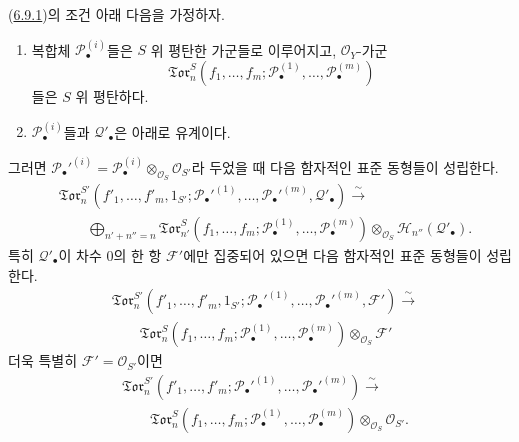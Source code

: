 \begin{corollary}[6.9.6]
\label{III.6.9.6-fr}
(\hyperref[subsection:III.6.9.fr]{6.9.1})의 조건 아래 다음을
가정하자.
\begin{enumerate}
  \item[$1^\circ$] 복합체 $\mathscr P_\bullet^{(i)}$들은 $S$ 위
  평탄한 가군들로 이루어지고, $\mathscr O_Y$-가군
  \[
    \mathfrak{Tor}_n^S
    (f_1,\ldots,f_m;
     \mathscr P_\bullet^{(1)},\ldots,\mathscr P_\bullet^{(m)})
  \]
  들은 $S$ 위 평탄하다.
  \item[$2^\circ$] $\mathscr P_\bullet^{(i)}$들과
  $\mathscr Q'_\bullet$은 아래로 유계이다.
\end{enumerate}

그러면
$\mathscr P_\bullet'^{(i)}
=\mathscr P_\bullet^{(i)}\otimes_{\mathscr O_S}\mathscr O_{S'}$라
두었을 때 다음 함자적인 표준 동형들이 성립한다.
\[
\begin{split}
  &\mathfrak{Tor}_n^{S'}
  (f'_1,\ldots,f'_m,1_{S'};
   \mathscr P_\bullet'^{(1)},\ldots,
   \mathscr P_\bullet'^{(m)},\mathscr Q'_\bullet)
  \xrightarrow{\sim}\\
  &\qquad
  \bigoplus_{n'+n''=n}
  \mathfrak{Tor}_{n'}^S
  (f_1,\ldots,f_m;
   \mathscr P_\bullet^{(1)},\ldots,
   \mathscr P_\bullet^{(m)})
  \otimes_{\mathscr O_S}\mathscr H_{n''}(\mathscr Q'_\bullet).
\end{split}
\tag{6.9.6.1}\label{III.6.9.6.1.fr}
\]
특히 $\mathscr Q'_\bullet$이 차수 $0$의 한 항
$\mathscr F'$에만 집중되어 있으면 다음 함자적인 표준 동형들이
성립한다.
\[
\begin{split}
  &\mathfrak{Tor}_n^{S'}
  (f'_1,\ldots,f'_m,1_{S'};
   \mathscr P_\bullet'^{(1)},\ldots,
   \mathscr P_\bullet'^{(m)},\mathscr F')
  \xrightarrow{\sim}\\
  &\qquad
  \mathfrak{Tor}_n^S
  (f_1,\ldots,f_m;
   \mathscr P_\bullet^{(1)},\ldots,
   \mathscr P_\bullet^{(m)})
  \otimes_{\mathscr O_S}\mathscr F'
\end{split}
\tag{6.9.6.2}\label{III.6.9.6.2.fr}
\]
더욱 특별히 $\mathscr F'=\mathscr O_{S'}$이면
\[
\begin{split}
  &\mathfrak{Tor}_n^{S'}
  (f'_1,\ldots,f'_m;
   \mathscr P_\bullet'^{(1)},\ldots,
   \mathscr P_\bullet'^{(m)})
  \xrightarrow{\sim}\\
  &\qquad
  \mathfrak{Tor}_n^S
  (f_1,\ldots,f_m;
   \mathscr P_\bullet^{(1)},\ldots,
   \mathscr P_\bullet^{(m)})
  \otimes_{\mathscr O_S}\mathscr O_{S'}.
\end{split}
\tag{6.9.6.3}\label{III.6.9.6.3.fr}
\]
\end{corollary}

